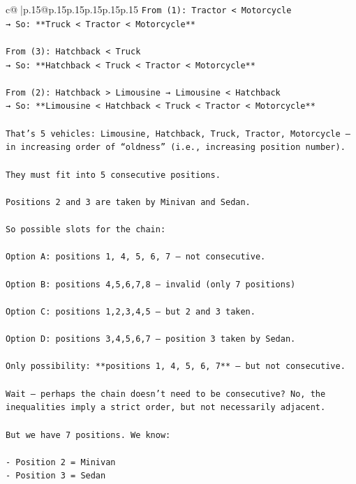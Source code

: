 \documentclass{article}
\begin{document}
{\begin{supertabular}{c@{$\;$}|p{.15\linewidth}@{}p{.15\linewidth}p{.15\linewidth}p{.15\linewidth}p{.15\linewidth}p{.15\linewidth}}
{{{\texttt{From (1): Tractor < Motorcycle  } \\
\texttt{→ So: **Truck < Tractor < Motorcycle**} \\
\\ 
\texttt{From (3): Hatchback < Truck  } \\
\texttt{→ So: **Hatchback < Truck < Tractor < Motorcycle**} \\
\\ 
\texttt{From (2): Hatchback > Limousine → Limousine < Hatchback  } \\
\texttt{→ So: **Limousine < Hatchback < Truck < Tractor < Motorcycle**} \\
\\ 
\texttt{That’s 5 vehicles: Limousine, Hatchback, Truck, Tractor, Motorcycle — in increasing order of “oldness” (i.e., increasing position number).} \\
\\ 
\texttt{They must fit into 5 consecutive positions.} \\
\\ 
\texttt{Positions 2 and 3 are taken by Minivan and Sedan.} \\
\\ 
\texttt{So possible slots for the chain:} \\
\\ 
\texttt{Option A: positions 1, 4, 5, 6, 7 — not consecutive.} \\
\\ 
\texttt{Option B: positions 4,5,6,7,8 — invalid (only 7 positions)} \\
\\ 
\texttt{Option C: positions 1,2,3,4,5 — but 2 and 3 taken.} \\
\\ 
\texttt{Option D: positions 3,4,5,6,7 — position 3 taken by Sedan.} \\
\\ 
\texttt{Only possibility: **positions 1, 4, 5, 6, 7** — but not consecutive.} \\
\\ 
\texttt{Wait — perhaps the chain doesn’t need to be consecutive? No, the inequalities imply a strict order, but not necessarily adjacent.} \\
\\ 
\texttt{But we have 7 positions. We know:} \\
\\ 
\texttt{{-} Position 2 = Minivan  } \\
\texttt{{-} Position 3 = Sedan} \\
}}}
\end{supertabular}}
\end{document}
